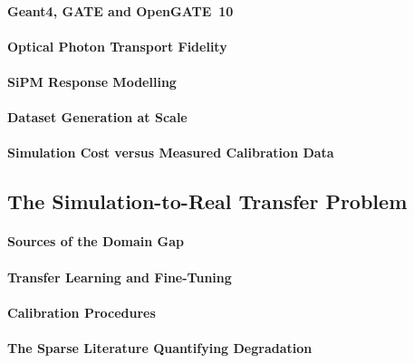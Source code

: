 \paragraph{Geant4, GATE and OpenGATE~10}

\paragraph{Optical Photon Transport Fidelity}

\paragraph{SiPM Response Modelling}

\paragraph{Dataset Generation at Scale}

\paragraph{Simulation Cost versus Measured Calibration Data}

\subsection{The Simulation-to-Real Transfer Problem}
\label{sec:sim-to-real}

\paragraph{Sources of the Domain Gap}

\paragraph{Transfer Learning and Fine-Tuning}

\paragraph{Calibration Procedures}

\paragraph{The Sparse Literature Quantifying Degradation}

